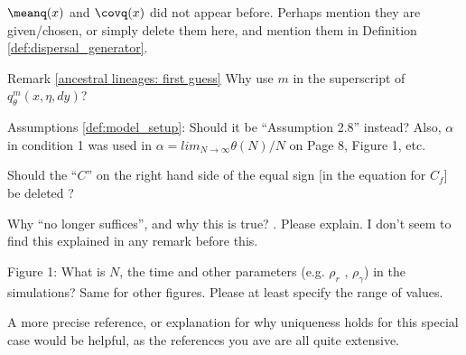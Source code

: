 \reply{
}

\begin{point}{\revref}
$\meanq(x)$ and $\covq(x)$ did not appear before. Perhaps mention they
are given/chosen, or simply delete them here, and mention them in Definition \ref{def:dispersal_generator}.
\end{point}

\reply{
}

\begin{point}{\revref}
Remark \ref{ancestral lineages: first guess}
Why use $m$ in the superscript of $q_\theta^m(x, \eta, dy)$?
\end{point}

\reply{
}

\begin{point}{}
Assumptions \ref{def:model_setup}: Should it be ``Assumption 2.8'' instead? Also, $\alpha$ in condition 1 was
used in $\alpha = lim_{N \to \infty} \theta(N)/N$ on Page 8, Figure 1, etc.
\end{point}

\reply{
}

\begin{point}{\revref}
    Should the ``$C$'' on the right hand side of the equal sign [in the equation for $C_f$] be deleted ?
\end{point}

\reply{
}

\begin{point}{\revref}
    Why ``no longer suffices'', and why this is true? . Please
explain. I don’t seem to find this explained in any remark before this.
\end{point}

\reply{
}

\begin{point}{}
Figure 1: What is $N$, the time and other parameters (e.g. $\rho_r$ , $\rho_\gamma$) in the simulations? Same
for other figures. Please at least specify the range of values.
\end{point}

\reply{
}

\begin{point}{\revref}
A more precise reference, or explanation for why
uniqueness holds for this special case would be helpful, as the references you ave are all
quite extensive.
\end{point}

\reply{
}


